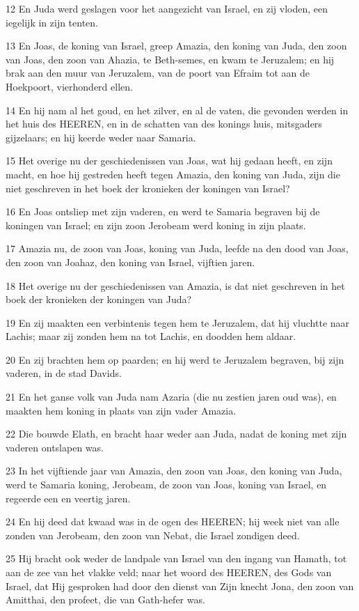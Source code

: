 \par 12 En Juda werd geslagen voor het aangezicht van Israel, en zij vloden, een iegelijk in zijn tenten.
\par 13 En Joas, de koning van Israel, greep Amazia, den koning van Juda, den zoon van Joas, den zoon van Ahazia, te Beth-semes, en kwam te Jeruzalem; en hij brak aan den muur van Jeruzalem, van de poort van Efraim tot aan de Hoekpoort, vierhonderd ellen.
\par 14 En hij nam al het goud, en het zilver, en al de vaten, die gevonden werden in het huis des HEEREN, en in de schatten van des konings huis, mitsgaders gijzelaars; en hij keerde weder naar Samaria.
\par 15 Het overige nu der geschiedenissen van Joas, wat hij gedaan heeft, en zijn macht, en hoe hij gestreden heeft tegen Amazia, den koning van Juda, zijn die niet geschreven in het boek der kronieken der koningen van Israel?
\par 16 En Joas ontsliep met zijn vaderen, en werd te Samaria begraven bij de koningen van Israel; en zijn zoon Jerobeam werd koning in zijn plaats.
\par 17 Amazia nu, de zoon van Joas, koning van Juda, leefde na den dood van Joas, den zoon van Joahaz, den koning van Israel, vijftien jaren.
\par 18 Het overige nu der geschiedenissen van Amazia, is dat niet geschreven in het boek der kronieken der koningen van Juda?
\par 19 En zij maakten een verbintenis tegen hem te Jeruzalem, dat hij vluchtte naar Lachis; maar zij zonden hem na tot Lachis, en doodden hem aldaar.
\par 20 En zij brachten hem op paarden; en hij werd te Jeruzalem begraven, bij zijn vaderen, in de stad Davids.
\par 21 En het ganse volk van Juda nam Azaria (die nu zestien jaren oud was), en maakten hem koning in plaats van zijn vader Amazia.
\par 22 Die bouwde Elath, en bracht haar weder aan Juda, nadat de koning met zijn vaderen ontslapen was.
\par 23 In het vijftiende jaar van Amazia, den zoon van Joas, den koning van Juda, werd te Samaria koning, Jerobeam, de zoon van Joas, koning van Israel, en regeerde een en veertig jaren.
\par 24 En hij deed dat kwaad was in de ogen des HEEREN; hij week niet van alle zonden van Jerobeam, den zoon van Nebat, die Israel zondigen deed.
\par 25 Hij bracht ook weder de landpale van Israel van den ingang van Hamath, tot aan de zee van het vlakke veld; naar het woord des HEEREN, des Gods van Israel, dat Hij gesproken had door den dienst van Zijn knecht Jona, den zoon van Amitthai, den profeet, die van Gath-hefer was.
